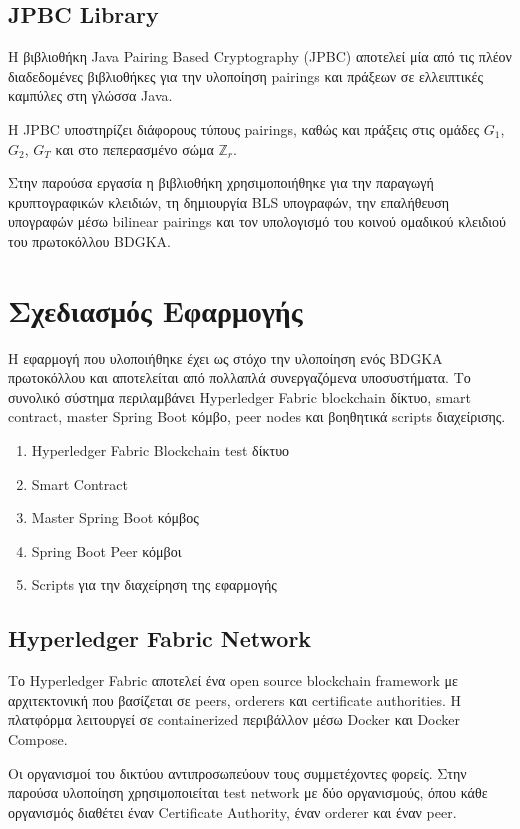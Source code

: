 \documentclass[12pt,a4paper]{report}
\begin{document}
\section{JPBC Library}

Η βιβλιοθήκη Java Pairing Based Cryptography (JPBC)
αποτελεί μία από τις πλέον διαδεδομένες βιβλιοθήκες
για την υλοποίηση pairings και πράξεων σε ελλειπτικές
καμπύλες στη γλώσσα Java.

Η JPBC υποστηρίζει διάφορους τύπους pairings,
καθώς και πράξεις στις ομάδες \(G_1\), \(G_2\),
\(G_T\) και στο πεπερασμένο σώμα \(\mathbb{Z}_r\).

Στην παρούσα εργασία η βιβλιοθήκη χρησιμοποιήθηκε για
την παραγωγή κρυπτογραφικών κλειδιών, τη δημιουργία
BLS υπογραφών, την επαλήθευση υπογραφών μέσω bilinear
pairings και τον υπολογισμό του κοινού ομαδικού
κλειδιού του πρωτοκόλλου BDGKA.

\chapter{Σχεδιασμός Εφαρμογής}

Η εφαρμογή που υλοποιήθηκε έχει ως στόχο την υλοποίηση ενός BDGKA πρωτοκόλλου και αποτελείται από πολλαπλά συνεργαζόμενα υποσυστήματα. Το συνολικό σύστημα περιλαμβάνει Hyperledger Fabric blockchain δίκτυο, smart contract, master Spring Boot κόμβο, peer nodes και βοηθητικά scripts διαχείρισης.

	\begin{enumerate}
		\item Hyperledger Fabric Blockchain test  δίκτυο		
		\item Smart Contract		
		\item Master Spring Boot κόμβος		
		\item Spring Boot Peer  κόμβοι		
		\item Scripts  για την διαχείρηση της εφαρμογής		
	\end{enumerate}

\section{Hyperledger Fabric Network}

Το Hyperledger Fabric αποτελεί ένα open source blockchain framework με αρχιτεκτονική που βασίζεται σε peers, orderers και certificate authorities. Η πλατφόρμα λειτουργεί σε containerized περιβάλλον μέσω Docker και Docker Compose.

Οι οργανισμοί του δικτύου αντιπροσωπεύουν τους συμμετέχοντες φορείς. Στην παρούσα υλοποίηση χρησιμοποιείται test network με δύο οργανισμούς, όπου κάθε οργανισμός διαθέτει έναν Certificate Authority, έναν orderer και έναν peer.
\end{document}
